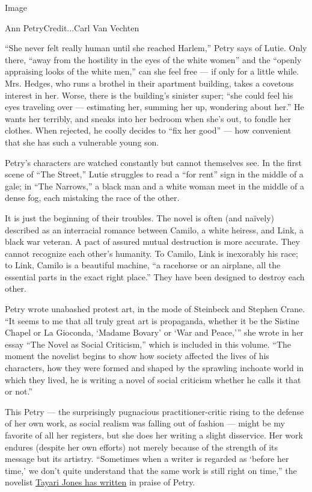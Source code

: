 Image

Ann PetryCredit...Carl Van Vechten

``She never felt really human until she reached Harlem,'' Petry says of
Lutie. Only there, ``away from the hostility in the eyes of the white
women'' and the ``openly appraising looks of the white men,'' can she
feel free --- if only for a little while. Mrs. Hedges, who runs a
brothel in their apartment building, takes a covetous interest in her.
Worse, there is the building's sinister super; ``she could feel his eyes
traveling over --- estimating her, summing her up, wondering about
her.'' He wants her terribly, and sneaks into her bedroom when she's
out, to fondle her clothes. When rejected, he coolly decides to ``fix
her good'' --- how convenient that she has such a vulnerable young son.

Petry's characters are watched constantly but cannot themselves see. In
the first scene of ``The Street,'' Lutie struggles to read a ``for
rent'' sign in the middle of a gale; in ``The Narrows,'' a black man and
a white woman meet in the middle of a dense fog, each mistaking the race
of the other.

It is just the beginning of their troubles. The novel is often (and
naïvely) described as an interracial romance between Camilo, a white
heiress, and Link, a black war veteran. A pact of assured mutual
destruction is more accurate. They cannot recognize each other's
humanity. To Camilo, Link is inexorably his race; to Link, Camilo is a
beautiful machine, ``a racehorse or an airplane, all the essential parts
in the exact right place.'' They have been designed to destroy each
other.

Petry wrote unabashed protest art, in the mode of Steinbeck and Stephen
Crane. ``It seems to me that all truly great art is propaganda, whether
it be the Sistine Chapel or La Gioconda, `Madame Bovary' or `War and
Peace,''' she wrote in her essay ``The Novel as Social Criticism,''
which is included in this volume. ``The moment the novelist begins to
show how society affected the lives of his characters, how they were
formed and shaped by the sprawling inchoate world in which they lived,
he is writing a novel of social criticism whether he calls it that or
not.''

This Petry --- the surprisingly pugnacious practitioner-critic rising to
the defense of her own work, as social realism was falling out of
fashion --- might be my favorite of all her registers, but she does her
writing a slight disservice. Her work endures (despite her own efforts)
not merely because of the strength of its message but its artistry.
``Sometimes when a writer is regarded as `before her time,' we don't
quite understand that the same work is still right on time,'' the
novelist
\href{https://www.nytimes3xbfgragh.onion/2018/11/10/books/review/in-praise-of-ann-petry.html}{Tayari
Jones has written} in praise of Petry.

